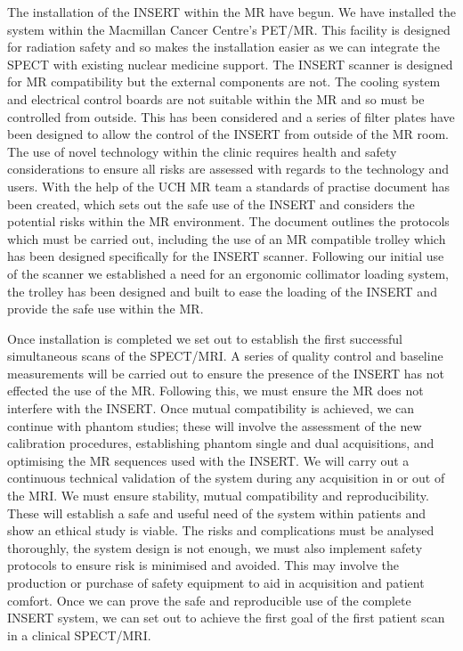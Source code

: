 The installation of the \acrshort{INSERT} within the \acrshort{MR} have begun. We have installed the system within the Macmillan Cancer Centre's \acrshort{PET/MR}. This facility is designed for radiation safety and so makes the installation easier as we can integrate the \acrshort{SPECT} with existing nuclear medicine support. The \acrshort{INSERT} scanner is designed for \acrshort{MR} compatibility but the external components are not. The cooling system and electrical control boards are not suitable within the \acrshort{MR} and so must be controlled from outside. This has been considered and a series of filter plates have been designed to allow the control of the \acrshort{INSERT} from outside of the \acrshort{MR} room. The use of novel technology within the clinic requires health and safety considerations to ensure all risks are assessed with regards to the technology and users. With the help of the \acrshort{UCH} \acrshort{MR} team a standards of practise document has been created, which sets out the safe use of the \acrshort{INSERT} and considers the potential risks within the \acrshort{MR} environment. The document outlines the protocols which must be carried out, including the use of an \acrshort{MR} compatible trolley which has been designed specifically for the \acrshort{INSERT} scanner. Following our initial use of the scanner we established a need for an ergonomic collimator loading system, the trolley has been designed and built to ease the loading of the \acrshort{INSERT} and provide the safe use within the \acrshort{MR}. 

Once installation is completed we set out to establish the first successful simultaneous scans of the \acrshort{SPECT/MRI}. A series of quality control and baseline measurements will be carried out to ensure the presence of the \acrshort{INSERT} has not effected the use of the \acrshort{MR}. Following this, we must ensure the \acrshort{MR} does not interfere with the \acrshort{INSERT}. Once mutual compatibility is achieved, we can continue with phantom studies; these will involve the assessment of the new calibration procedures, establishing phantom single and dual acquisitions, and optimising the \acrshort{MR} sequences used with the \acrshort{INSERT}. We will carry out a continuous technical validation of the system during any acquisition in or out of the \acrshort{MRI}. We must ensure stability, mutual compatibility and reproducibility. These will establish a safe and useful need of the system within patients and show an ethical study is viable. The risks and complications must be analysed thoroughly, the system design is not enough, we must also implement safety protocols to ensure risk is minimised and avoided. This may involve the production or purchase of safety equipment to aid in acquisition and patient comfort. Once we can prove the safe and reproducible use of the complete \acrshort{INSERT} system, we can set out to achieve the first goal of the first patient scan in a clinical \acrshort{SPECT/MRI}.